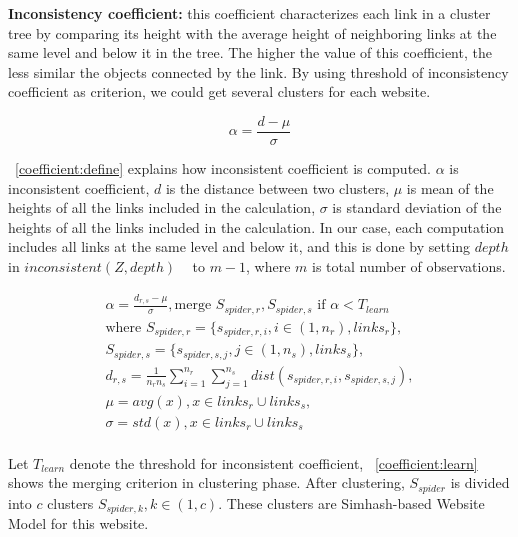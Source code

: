 {\bf Inconsistency coefficient:} this coefficient characterizes each link in a cluster tree by
comparing its height with the average height of neighboring links at the same
level and below it in the tree. The higher the value of this
coefficient, the less similar the
objects connected by the link. By using threshold of inconsistency
coefficient as criterion, we could get several clusters for each website.

\begin{equation}
  \label{coefficient:define}
  \alpha  = \frac{d - \mu}{\sigma}
\end{equation}

~\autoref{coefficient:define} explains how inconsistent coefficient is computed.
$\alpha$ is inconsistent coefficient, $d$ is the distance between two
clusters, $\mu$ is mean of the heights of all the links included in the
calculation, $\sigma$ is standard deviation of the heights of all the links
included in the calculation. In our case, each computation includes all links at
the same level and below it, and this is done by setting $depth$ in
$inconsistent(Z, depth)$ ~\cite{icintro} to $m-1$, where $m$ is total number of observations.

\begin{equation}
  \label{coefficient:learn}
  \begin{gathered}
    \alpha = \frac{d_{r,s} - \mu}{\sigma}, \text{merge } S_{spider, r},
    S_{spider, s} \text{ if } \alpha < T_{learn} \\
    \text{where }
    S_{spider, r} = \{s_{spider, r, i}, i \in (1, n_r), links_r\}, \\
    S_{spider, s} = \{s_{spider, s, j}, j \in (1, n_s), links_s\}, \\
    d_{r, s} = \frac{1}{n_rn_s}\sum_{i=1}^{n_r}\sum_{j=1}^{n_s} dist(s_{spider,
    r, i}, s_{spider, s, j}), \\ 
    \mu = avg(x), x \in  links_r \cup links_s, \\
    \sigma = std(x), x \in links_r \cup links_s \\
  \end{gathered}
\end{equation}

Let $T_{learn}$ denote the threshold for inconsistent coefficient, 
~\autoref{coefficient:learn} shows the merging criterion in clustering phase.
After clustering, $S_{spider}$ is divided into $c$ clusters $S_{spider, k}, k \in (1, c)$.
These clusters are Simhash-based Website Model for this website.

